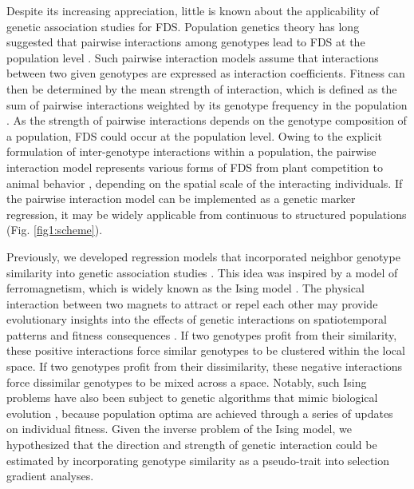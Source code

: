 \documentclass[12pt,]{article}
\begin{document}
Despite its increasing appreciation, little is known about the applicability of genetic association studies for FDS. Population genetics theory has long suggested that pairwise interactions among genotypes lead to FDS at the population level \citep{schutz1969inter, cockerham1972frequency, asmussen_frequency-dependent_1990, schneider_maximization_2008}. Such pairwise interaction models assume that interactions between two given genotypes are expressed as interaction coefficients. Fitness can then be determined by the mean strength of interaction, which is defined as the sum of pairwise interactions weighted by its genotype frequency in the population \citep{cockerham1972frequency, asmussen_frequency-dependent_1990}. As the strength of pairwise interactions depends on the genotype composition of a population, FDS could occur at the population level. Owing to the explicit formulation of inter-genotype interactions within a population, the pairwise interaction model represents various forms of FDS from plant competition \citep{schutz1969inter} to animal behavior \citep{alvarez2005models}, depending on the spatial scale of the interacting individuals. If the pairwise interaction model can be implemented as a genetic marker regression, it may be widely applicable from continuous to structured populations (Fig. \ref{fig1:scheme}).

Previously, we developed regression models that incorporated neighbor genotype similarity into genetic association studies \citep{sato2019neighbor, sato2020neighbor}. This idea was inspired by a model of ferromagnetism, which is widely known as the Ising model \citep{cipra1987introduction}. The physical interaction between two magnets to attract or repel each other may provide evolutionary insights into the effects of genetic interactions on spatiotemporal patterns and fitness consequences \citep{sato2019neighbor}. If two genotypes profit from their similarity, these positive interactions force similar genotypes to be clustered within the local space. If two genotypes profit from their dissimilarity, these negative interactions force dissimilar genotypes to be mixed across a space. Notably, such Ising problems have also been subject to genetic algorithms that mimic biological evolution \citep{anderson1991two, prugel1997dynamics}, because population optima are achieved through a series of updates on individual fitness. Given the inverse problem of the Ising model, we hypothesized that the direction and strength of genetic interaction could be estimated by incorporating genotype similarity as a pseudo-trait into selection gradient analyses.
\end{document}
